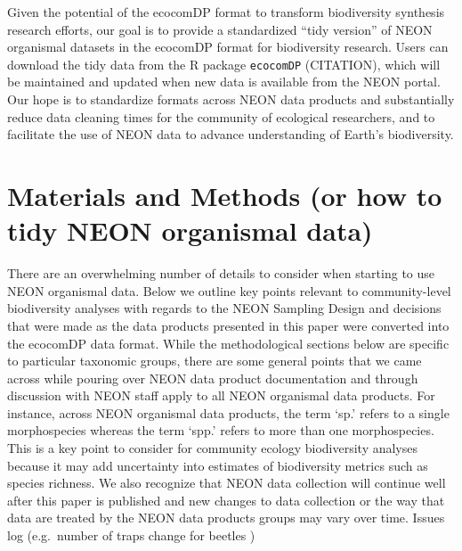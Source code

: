 \documentclass[
  12pt,
]{article}
\begin{document}
Given the potential of the ecocomDP format to transform biodiversity synthesis research efforts, our goal is to provide a standardized ``tidy version'' of NEON organismal datasets in the ecocomDP format for biodiversity research. Users can download the tidy data from the R package \texttt{ecocomDP} (CITATION), which will be maintained and updated when new data is available from the NEON portal. Our hope is to standardize formats across NEON data products and substantially reduce data cleaning times for the community of ecological researchers, and to facilitate the use of NEON data to advance understanding of Earth's biodiversity.

\hypertarget{materials-and-methods-or-how-to-tidy-neon-organismal-data}{%
\section{Materials and Methods (or how to tidy NEON organismal data)}\label{materials-and-methods-or-how-to-tidy-neon-organismal-data}}

There are an overwhelming number of details to consider when starting to use NEON organismal data. Below we outline key points relevant to community-level biodiversity analyses with regards to the NEON Sampling Design and decisions that were made as the data products presented in this paper were converted into the ecocomDP data format. While the methodological sections below are specific to particular taxonomic groups, there are some general points that we came across while pouring over NEON data product documentation and through discussion with NEON staff apply to all NEON organismal data products. For instance, across NEON organismal data products, the term `sp.' refers to a single morphospecies whereas the term `spp.' refers to more than one morphospecies. This is a key point to consider for community ecology biodiversity analyses because it may add uncertainty into estimates of biodiversity metrics such as species richness. We also recognize that NEON data collection will continue well after this paper is published and new changes to data collection or the way that data are treated by the NEON data products groups may vary over time. Issues log (e.g.~number of traps change for beetles )
\end{document}
